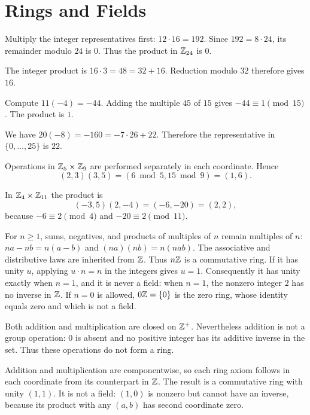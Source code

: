 \section{Rings and Fields}

Multiply the integer representatives first: $12\cdot16=192$. Since $192=8\cdot24$, its remainder modulo $24$ is $0$. Thus the product in $\mathbb{Z}_{24}$ is $\boxed{0}$.

The integer product is $16\cdot3=48=32+16$. Reduction modulo $32$ therefore gives $\boxed{16}$.

Compute $11(-4)=-44$. Adding the multiple $45$ of $15$ gives $-44\equiv1\pmod {15}$. The product is $\boxed{1}$.

We have $20(-8)=-160=-7\cdot26+22$. Therefore the representative in $\{0,\ldots,25\}$ is $\boxed{22}$.

Operations in $\mathbb{Z}_5\times\mathbb{Z}_9$ are performed separately in each coordinate. Hence
\[(2,3)(3,5)=(6\bmod5,15\bmod9)=\boxed{(1,6)}.\]

In $\mathbb{Z}_4\times\mathbb{Z}_{11}$ the product is
\[(-3,5)(2,-4)=(-6,-20)=(2,2),\]
because $-6\equiv2\pmod4$ and $-20\equiv2\pmod {11}$.

For $n\ge1$, sums, negatives, and products of multiples of $n$ remain multiples of $n$: $na-nb=n(a-b)$ and $(na)(nb)=n(nab)$. The associative and distributive laws are inherited from $\mathbb{Z}$. Thus $n\mathbb{Z}$ is a commutative ring. If it has unity $u$, applying $u\cdot n=n$ in the integers gives $u=1$. Consequently it has unity exactly when $n=1$, and it is never a field: when $n=1$, the nonzero integer $2$ has no inverse in $\mathbb{Z}$. If $n=0$ is allowed, $0\mathbb{Z}=\{0\}$ is the zero ring, whose identity equals zero and which is not a field.

Both addition and multiplication are closed on $\mathbb{Z}^+$. Nevertheless addition is not a group operation: $0$ is absent and no positive integer has its additive inverse in the set. Thus these operations do not form a ring.

Addition and multiplication are componentwise, so each ring axiom follows in each coordinate from its counterpart in $\mathbb{Z}$. The result is a commutative ring with unity $(1,1)$. It is not a field: $(1,0)$ is nonzero but cannot have an inverse, because its product with any $(a,b)$ has second coordinate zero.

